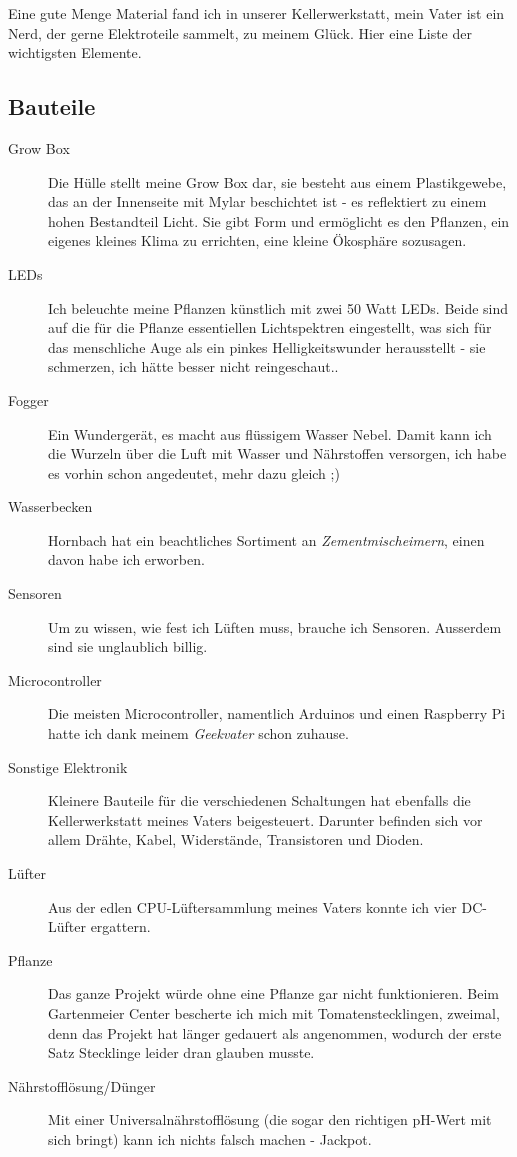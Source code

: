 \documentclass[12pt,titlepage,a4paper]{article}
\begin{document}
Eine gute Menge Material fand ich in unserer Kellerwerkstatt, mein Vater ist ein Nerd, der gerne Elektroteile sammelt, zu meinem Glück. Hier eine Liste der wichtigsten Elemente.

\subsection{Bauteile}
\begin{description}
\item[Grow Box] Die Hülle stellt meine Grow Box dar, sie besteht aus einem Plastikgewebe, das an der Innenseite mit Mylar beschichtet ist - es reflektiert zu einem hohen Bestandteil Licht. Sie gibt Form und ermöglicht es den Pflanzen, ein eigenes kleines Klima zu errichten, eine kleine Ökosphäre sozusagen.
\item[LEDs] Ich beleuchte meine Pflanzen künstlich mit zwei 50 Watt LEDs. Beide sind auf die für die Pflanze essentiellen Lichtspektren eingestellt, was sich für das menschliche Auge als ein pinkes Helligkeitswunder herausstellt - sie schmerzen, ich hätte besser nicht reingeschaut..
\item[Fogger] Ein Wundergerät, es macht aus flüssigem Wasser Nebel. Damit kann ich die Wurzeln über die Luft mit Wasser und Nährstoffen versorgen, ich habe es vorhin schon angedeutet, mehr dazu gleich ;)
\item[Wasserbecken] Hornbach hat ein beachtliches Sortiment an \textit{Zementmischeimern}, einen davon habe ich erworben.
\item[Sensoren] Um zu wissen, wie fest ich Lüften muss, brauche ich Sensoren. Ausserdem sind sie unglaublich billig.
\item[Microcontroller] Die meisten Microcontroller, namentlich Arduinos und einen Raspberry Pi hatte ich dank meinem \textit{Geekvater} schon zuhause.
\item[Sonstige Elektronik] Kleinere Bauteile für die verschiedenen Schaltungen hat ebenfalls die Kellerwerkstatt meines Vaters beigesteuert. Darunter befinden sich vor allem Drähte, Kabel, Widerstände,  Transistoren und Dioden.
\item[Lüfter] Aus der edlen CPU-Lüftersammlung meines Vaters konnte ich vier DC-Lüfter ergattern.
\item[Pflanze] Das ganze Projekt würde ohne eine Pflanze gar nicht funktionieren. Beim Gartenmeier Center bescherte ich mich mit Tomatenstecklingen, zweimal, denn das Projekt hat länger gedauert als angenommen, wodurch der erste Satz Stecklinge leider dran glauben musste.
\item[Nährstofflösung/Dünger] Mit einer Universalnährstofflösung (die sogar den richtigen pH-Wert mit sich bringt) kann ich nichts falsch machen - Jackpot.
\end{description}
\end{document}
